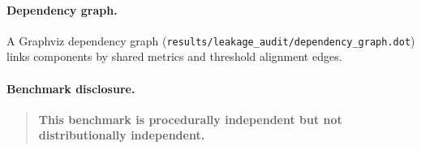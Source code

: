 \paragraph{Dependency graph.}
A Graphviz dependency graph (\texttt{results/leakage\_audit/dependency\_graph.dot}) links
components by shared metrics and threshold alignment edges.

\paragraph{Benchmark disclosure.}
\begin{quote}
\textbf{This benchmark is procedurally independent but not distributionally independent.}
\end{quote}


